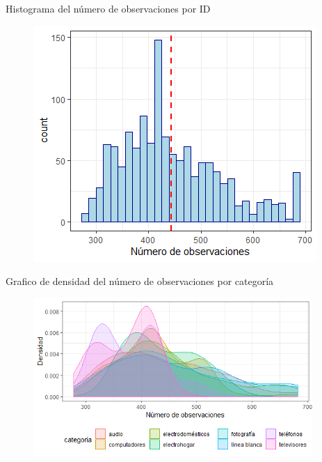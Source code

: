 \documentclass[xcolor=dvipsnames]{beamer}
\begin{document}
\begin{frame}
Histograma del n\'umero de observaciones por ID
\begin{figure}
\includegraphics[scale=0.8]{observaciones_producto.png}
\end{figure}
\end{frame}

\begin{frame}
Grafico de densidad del n\'umero de observaciones por categor\'ia
\begin{figure}
\includegraphics[height=6.00cm, scale=0.69]{observaciones_categoria.png}
\end{figure}
\end{frame}
\end{document}
